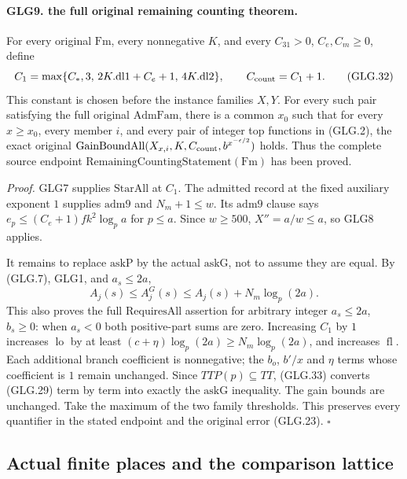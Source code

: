 \paragraph{GLG9. the full original remaining counting theorem.}
\label{claim:GLG9}
For every original \(\mathrm{Fm}\), every nonnegative \(K\),
and every \(C_{31}>0\), \(C_e,C_m\ge0\), define
\[
 C_1=\max\{C_*,3,\,2K.\mathrm{dl1}+C_e+1,\,
                                      4K.\mathrm{dl2}\},
                  \qquad C_{\rm count}=C_1+1.                    \tag{GLG.32}
\]
This constant is chosen before the instance families \(X,Y\).
For every such pair satisfying the full original
\(\mathrm{AdmFam}\), there is a common \(x_0\) such that
for every \(x\ge x_0\), every member \(i\), and every pair
of integer top functions in (GLG.2), the exact original
\(\mathrm{GainBoundAll}(X_{x,i},K,C_{\rm count},
                 b^{x^{-\epsilon/2}})\) holds.
Thus the complete source endpoint
\(\mathrm{RemainingCountingStatement}(\mathrm{Fm})\)
has been proved.

\emph{Proof.}
GLG7 supplies \(\mathrm{StarAll}\) at \(C_1\).
The admitted record at the fixed auxiliary exponent \(1\)
supplies \(\mathrm{adm9}\) and \(N_m+1\le w\).
Its \(\mathrm{adm9}\) clause says
\(e_p\le(C_e+1)fk^2\log_pa\) for \(p\le a\).
Since \(w\ge500\), \(X''=a/w\le a\), so GLG8 applies.

It remains to replace \(\mathrm{askP}\) by the actual
\(\mathrm{askG}\), not to assume they are equal. By (GLG.7),
GLG1, and \(a_s\le2a\),
\[
           A_j(s)\le A_j^G(s)
                \le A_j(s)+N_m\log_p(2a).                         \tag{GLG.33}
\]
This also proves the full \(\mathrm{RequiresAll}\) assertion
for arbitrary integer \(a_s\le2a\), \(b_s\ge0\): when
\(a_s<0\) both positive-part sums are zero.
Increasing \(C_1\) by \(1\) increases
\(\operatorname{lo}\) by at least
\((c+\eta)\log_p(2a)\ge N_m\log_p(2a)\), and increases
\(\operatorname{fl}\). Each additional branch coefficient
is nonnegative; the \(b_o\), \(b'/x\) and \(\eta\) terms
whose coefficient is \(1\) remain unchanged.
Since \(TTP(p)\subseteq TT\), (GLG.33) converts (GLG.29)
term by term into exactly the \(\mathrm{askG}\) inequality.
The gain bounds are unchanged. Take the maximum of the
two family thresholds. This preserves every quantifier
in the stated endpoint and the original error (GLG.23).
\hfill\(\square\)

\subsection{Actual finite places and the comparison lattice}

